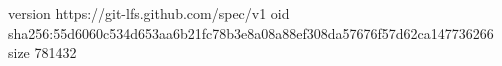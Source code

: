 version https://git-lfs.github.com/spec/v1
oid sha256:55d6060c534d653aa6b21fc78b3e8a08a88ef308da57676f57d62ca147736266
size 781432
